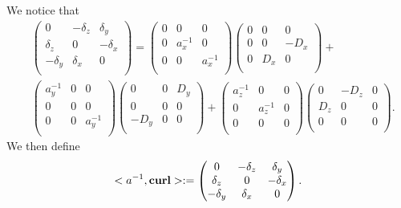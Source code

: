 \documentclass[12pt,reqno]{amsart}
\newcommand{\curl}{{\bf curl}}
\theoremstyle{definition}
\numberwithin{equation}{section}
\begin{document}
		We notice that 
		\begin{align*}
			&
			\begin{pmatrix}
				0& -\delta_z & \delta _y\\
				\delta_z&0&-\delta_x\\
				-\delta_y&\delta_x&0\\
			\end{pmatrix}=
			\begin{pmatrix}
				0& 0 & 0\\
				0&a_x^{-1}&0\\
				0&0&a_x^{-1}\\
			\end{pmatrix}
			\begin{pmatrix}
				0& 0 & 0\\
				0&0&-D_x\\
				0&D_x&0\\
			\end{pmatrix}+\\&
			\begin{pmatrix}
				a_y^{-1}& 0 & 0\\
				0&0&0\\
				0&0&a_y^{-1}\\
			\end{pmatrix}
			\begin{pmatrix}
				0& 0 & D _y\\
				0&0&0\\
				-D_y&0&0\\
			\end{pmatrix}+
			\begin{pmatrix}
				a_z^{-1}& 0 & 0\\
				0&a_z^{-1}&0\\
				0&0&0\\
			\end{pmatrix}
			\begin{pmatrix}
				0& -D_z & 0\\
				D_z&0&0\\
				0&0&0\\
			\end{pmatrix}.
		\end{align*}
		We then define 
		$$
		<a^{-1},\curl>:=
		\begin{pmatrix}
			0& -\delta_z & \delta _y\\
			\delta_z&0&-\delta_x\\
			-\delta_y&\delta_x&0\\
		\end{pmatrix}.
		$$
		
\end{document}
